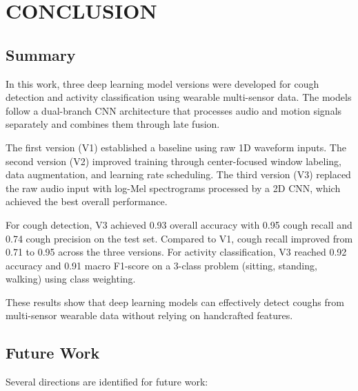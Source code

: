 \chapter{CONCLUSION}

\section{Summary}

In this work, three deep learning model versions were developed for cough detection and activity classification using wearable multi-sensor data. The models follow a dual-branch CNN architecture that processes audio and motion signals separately and combines them through late fusion.

The first version (V1) established a baseline using raw 1D waveform inputs. The second version (V2) improved training through center-focused window labeling, data augmentation, and learning rate scheduling. The third version (V3) replaced the raw audio input with log-Mel spectrograms processed by a 2D CNN, which achieved the best overall performance.

For cough detection, V3 achieved 0.93 overall accuracy with 0.95 cough recall and 0.74 cough precision on the test set. Compared to V1, cough recall improved from 0.71 to 0.95 across the three versions. For activity classification, V3 reached 0.92 accuracy and 0.91 macro F1-score on a 3-class problem (sitting, standing, walking) using class weighting.

These results show that deep learning models can effectively detect coughs from multi-sensor wearable data without relying on handcrafted features.

\section{Future Work}

Several directions are identified for future work:

